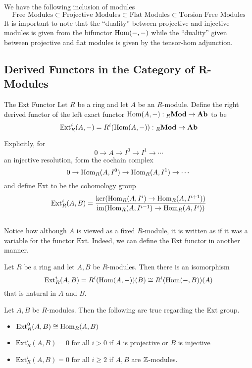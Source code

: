 \documentclass[a4paper]{article}
\begin{document}
We have the following inclusion of modules $$\text{Free Modules}\subset\text{Projective Modules}\subset\text{Flat Modules}\subset\text{Torsion Free Modules}$$ It is important to note that the ``duality'' between projective and injective modules is given from the bifunctor $\operatorname{Hom}(-,-)$ while the ``duality'' given between projective and flat modules is given by the tensor-hom adjunction. 

\subsection{Derived Functors in the Category of R-Modules}
\begin{defn}{The Ext Functor}{} Let $R$ be a ring and let $A$ be an $R$-module. Define the right derived functor of the left exact functor $\operatorname{Hom}(A,-):{_R\bold{Mod}}\to\bold{Ab}$ to be $$\text{Ext}_R^i(A,-)=R^i(\operatorname{Hom}(A,-)):{_R\bold{Mod}}\to\bold{Ab}$$ 
\end{defn}

Explicitly, for $$0\to A\to I^0\to I^1\to\cdots$$ an injective resolution, form the cochain complex $$0\to\operatorname{Hom}_R(A,I^0)\to\operatorname{Hom}_R(A,I^1)\to\cdots$$ and define $\text{Ext}$ to be the cohomology group $$\text{Ext}_R^i(A,B)=\frac{\ker(\operatorname{Hom}_R(A,I^i)\to\operatorname{Hom}_R(A,I^{i+1}))}{\operatorname{im}(\operatorname{Hom}_R(A,I^{i-1})\to\operatorname{Hom}_R(A,I^i))}$$~\\

Notice how although $A$ is viewed as a fixed $R$-module, it is written as if it was a variable for the functor $\text{Ext}$. Indeed, we can define the Ext functor in another manner. 

\begin{thm}{}{} Let $R$ be a ring and let $A,B$ be $R$-modules. Then there is an isomorphism $$\text{Ext}_R^i(A,B)=R^i(\operatorname{Hom}(A,-))(B)\cong R^i(\operatorname{Hom}(-,B))(A)$$ that is natural in $A$ and $B$. 
\end{thm}

\begin{thm}{}{} Let $A,B$ be $R$-modules. Then the following are true regarding the Ext group. 
\begin{itemize}
\item $\text{Ext}_R^0(A,B)\cong\operatorname{Hom}_R(A,B)$
\item $\text{Ext}_R^i(A,B)=0$ for all $i>0$ if $A$ is projective or $B$ is injective
\item $\text{Ext}_R^i(A,B)=0$ for all $i\geq 2$ if $A,B$ are $\mathbb{Z}$-modules. 
\end{itemize}
\end{thm}
\end{document}
